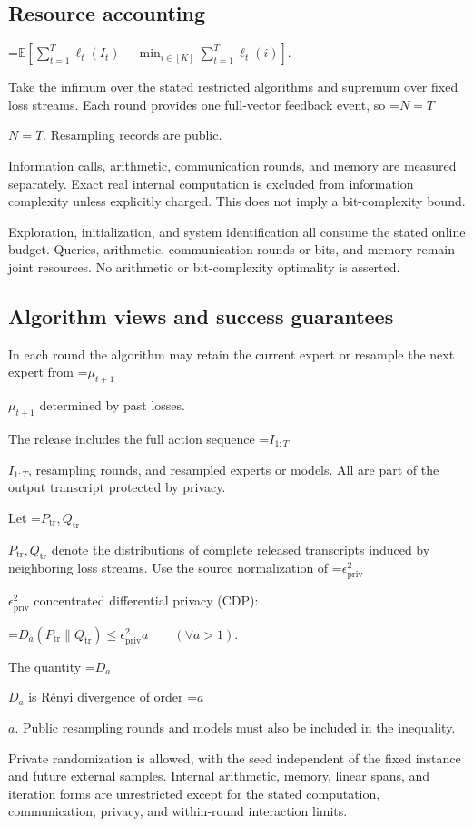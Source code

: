 \documentclass[10pt,a4paper]{article}
\newcommand{\AtlasMath}[1]{\par\begingroup\centering\setbox0=\hbox{$\displaystyle #1$}\ifdim\wd0>1.4\linewidth\typeout{ATLAS WIDE FORMULA: \the\wd0}\fi\ifdim\wd0>\linewidth\resizebox{\linewidth}{!}{\box0}\else\box0\fi\par\endgroup}
\newcommand{\AtlasInlineMath}[1]{\begingroup\setbox0=\hbox{$#1$}\ifdim\wd0>.4\linewidth\endgroup\AtlasMath{#1}\else\endgroup$#1$\fi}
\begin{document}
\subsection{Resource accounting}

\AtlasMath{\mathbb{E}\!\left[\sum_{t=1}^{T}\ell_t(I_t)-\min_{i\in[K]}\sum_{t=1}^{T}\ell_t(i)\right].}


Take the infimum over the stated restricted algorithms and supremum over fixed loss streams. Each round provides one full-vector feedback event, so \AtlasInlineMath{N=T}. Resampling records are public.

Information calls, arithmetic, communication rounds, and memory are measured separately. Exact real internal computation is excluded from information complexity unless explicitly charged. This does not imply a bit-complexity bound.

Exploration, initialization, and system identification all consume the stated online budget. Queries, arithmetic, communication rounds or bits, and memory remain joint resources. No arithmetic or bit-complexity optimality is asserted.

\subsection{Algorithm views and success guarantees}
In each round the algorithm may retain the current expert or resample the next expert from \AtlasInlineMath{\mu_{t+1}} determined by past losses.

The release includes the full action sequence \AtlasInlineMath{I_{1:T}}, resampling rounds, and resampled experts or models. All are part of the output transcript protected by privacy.

Let \AtlasInlineMath{P_{\mathrm{tr}},Q_{\mathrm{tr}}} denote the distributions of complete released transcripts induced by neighboring loss streams. Use the source normalization of \AtlasInlineMath{\epsilon_{\mathrm{priv}}^2} concentrated differential privacy (CDP):


\AtlasMath{D_a(P_{\mathrm{tr}}\|Q_{\mathrm{tr}})\le\epsilon_{\mathrm{priv}}^2 a\qquad(\forall a>1).}


The quantity \AtlasInlineMath{D_a} is Rényi divergence of order \AtlasInlineMath{a}. Public resampling rounds and models must also be included in the inequality.

Private randomization is allowed, with the seed independent of the fixed instance and future external samples. Internal arithmetic, memory, linear spans, and iteration forms are unrestricted except for the stated computation, communication, privacy, and within-round interaction limits.
\end{document}

